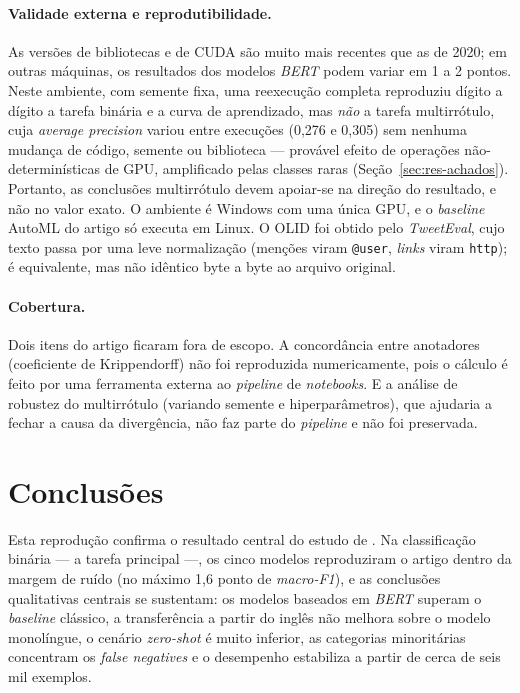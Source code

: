 \documentclass[sigconf, nonacm]{acmart}
\begin{document}
\paragraph{Validade externa e reprodutibilidade.} As versões de bibliotecas
e de CUDA são muito mais recentes que as de 2020; em outras máquinas, os
resultados dos modelos \emph{BERT} podem variar em 1 a 2 pontos. Neste ambiente,
com semente fixa, uma reexecução completa reproduziu dígito a dígito a tarefa
binária e a curva de aprendizado, mas \emph{não} a tarefa multirrótulo, cuja
\emph{average precision} variou entre execuções (0,276 e 0,305) sem nenhuma
mudança de código, semente ou biblioteca --- provável efeito de operações
não-determinísticas de GPU, amplificado pelas classes raras
(Seção~\ref{sec:res-achados}). Portanto, as conclusões multirrótulo devem
apoiar-se na direção do resultado, e não no valor exato. O
ambiente é Windows com uma única GPU, e o \emph{baseline} AutoML do artigo
só executa em Linux. O OLID foi obtido pelo \emph{TweetEval}, cujo texto passa
por uma leve normalização (menções viram \texttt{@user}, \emph{links} viram
\texttt{http}); é equivalente, mas não idêntico byte a byte ao arquivo
original.
 
\paragraph{Cobertura.} Dois itens do artigo ficaram fora de escopo. A
concordância entre anotadores (coeficiente de Krippendorff) não foi
reproduzida numericamente, pois o cálculo é feito por uma ferramenta
externa ao \emph{pipeline} de \emph{notebooks}. E a análise de robustez do
multirrótulo (variando semente e hiperparâmetros), que ajudaria a fechar a
causa da divergência, não faz parte do \emph{pipeline} e não foi
preservada.
 
\section{Conclusões}
\label{sec:conclusoes}
 
Esta reprodução confirma o resultado central do estudo de
\citet{leite2020toxic}. Na classificação binária --- a tarefa principal ---,
os cinco modelos reproduziram o artigo dentro da margem de ruído (no máximo
1,6 ponto de \emph{macro-F1}), e as conclusões qualitativas centrais se
sustentam: os modelos baseados em \emph{BERT} superam o \emph{baseline}
clássico, a transferência a partir do inglês não melhora sobre o modelo
monolíngue, o cenário \emph{zero-shot} é muito inferior, as categorias
minoritárias concentram os \emph{false negatives} e o desempenho estabiliza a
partir de cerca de seis mil exemplos.
 
\end{document}
